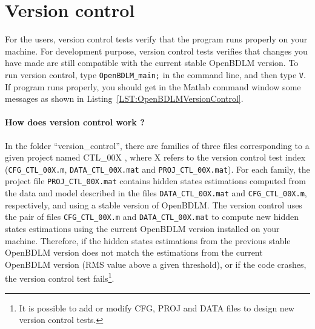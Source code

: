 \section{Version control}
\label{S:VERSIONCONTROL}

For the users, version control tests verify that the program runs properly on your machine. 
For development purpose, version control tests verifies that changes you have made are still compatible with the current stable OpenBDLM version. 
To run version control, type \colorbox{light-gray}{\lstinline[basicstyle = \mlttfamily \small, backgroundcolor = \color{light-gray}]!OpenBDLM_main;!} in the \MATLAB{} command line, and then type \colorbox{light-gray}{\lstinline[basicstyle = \mlttfamily \small, backgroundcolor = \color{light-gray}]!V!}. 
If program runs properly, you should get in the Matlab command window some messages as shown in Listing~\ref{LST:OpenBDLMVersionControl}.

\paragraph{How does version control work ?}
In the folder ``version\_control'', there are families of three files corresponding to a given project named CTL\_00X , where X refers to the version control test index (\lstinline[basicstyle = \mlttfamily \small, backgroundcolor = \color{light-gray}]!CFG_CTL_00X.m!, \lstinline[basicstyle = \mlttfamily \small, backgroundcolor = \color{light-gray}]!DATA_CTL_00X.mat! and \lstinline[basicstyle = \mlttfamily \small, backgroundcolor = \color{light-gray}]!PROJ_CTL_00X.mat!).
For each family, the project file \lstinline[basicstyle = \mlttfamily \small, backgroundcolor = \color{light-gray}]!PROJ_CTL_00X.mat! contains hidden states estimations computed from the data and model described in the files \lstinline[basicstyle = \mlttfamily \small, backgroundcolor = \color{light-gray}]!DATA_CTL_00X.mat! and \lstinline[basicstyle = \mlttfamily \small, backgroundcolor = \color{light-gray}]!CFG_CTL_00X.m!, respectively, and using a stable version of OpenBDLM.
The version control uses the pair of files \lstinline[basicstyle = \mlttfamily \small, backgroundcolor = \color{light-gray}]!CFG_CTL_00X.m! and \lstinline[basicstyle = \mlttfamily \small, backgroundcolor = \color{light-gray}]!DATA_CTL_00X.mat! to compute new hidden states estimations using the current  OpenBDLM version installed on your machine.
Therefore, if the hidden states estimations from the previous stable OpenBDLM version does not match the estimations from the current OpenBDLM version (RMS value above a given threshold), or if the code crashes, the version control test fails\footnote{It is possible to add or modify CFG, PROJ and DATA files to design new version control tests.}.


